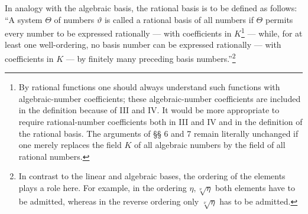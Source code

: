 \documentclass[11pt]{article}
\begin{document}
In analogy with the algebraic basis, the rational basis is to be defined as
follows: ``A system $\Theta$ of numbers $\vartheta$ is called a rational basis of
all numbers if $\Theta$ permits every number to be expressed rationally --- with
coefficients in $K$\footnote{By rational functions one should always understand
such functions with algebraic-number coefficients; these algebraic-number
coefficients are included in the definition because of III and IV. It would be
more appropriate to require rational-number coefficients both in III and IV and
in the definition of the rational basis. The arguments of §§ 6 and 7 remain
literally unchanged if one merely replaces the field $K$ of all algebraic numbers
by the field of all rational numbers.} --- while, for at least one well-ordering,
no basis number can be expressed rationally --- with coefficients in $K$ --- by
finitely many preceding basis numbers.''\footnote{In contrast to the linear and
algebraic bases, the ordering of the elements plays a role here. For example, in
the ordering $\eta,\sqrt[\nu]{\eta}$ both elements have to be admitted, whereas
in the reverse ordering only $\sqrt[\nu]{\eta}$ has to be admitted.}
\end{document}
